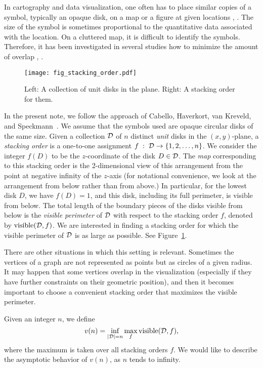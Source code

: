 \documentclass[11pt]{article}
\DeclareMathOperator{\vis}{\mathrm{visible}}
\begin{document}
In cartography and data visualization, one often has to place similar copies of a symbol, typically an opaque disk, on a map or a figure at given locations \cite{De99}, \cite{Gr90}. The size of the symbol is sometimes proportional to the quantitative data associated with the location. On a cluttered map, it is difficult to identify the symbols. Therefore, it has been investigated in several studies how to minimize the amount of overlap \cite{GrC78}, \cite{SlM03}.

\begin{figure}
\centerline{\texttt{[image: fig\_stacking\_order.pdf]}}
\caption{\label{fig_stacking_order}Left: A collection of unit disks in the plane. Right: A stacking order for them.}
\end{figure}


In the present note, we follow the approach of Cabello, Haverkort, van
Kreveld, and Speckmann~\cite{CaH10}. We assume that the symbols used are
opaque circular disks of the same size. Given a collection $\cal D$ of $n$
distinct {\em unit} disks in the $(x,y)$-plane, a {\em stacking order} is a one-to-one assignment $f\; :\;{\cal D} \rightarrow \{1, 2, \ldots, n\}$. We consider the integer $f(D)$ to be the $z$-coordinate of the disk $D\in\cal D$. The {\em map} corresponding to this stacking order is the 2-dimensional view of this arrangement from the point at negative infinity of the $z$-axis (for notational convenience, we look at the arrangement from below rather than from above.) In particular, for the lowest disk $D$, we have $f(D)=1$, and this disk, including its full perimeter, is visible from below. The total length of the
boundary pieces of the disks visible from below is the {\em visible perimeter}
of $\cal D$ with respect to the stacking order $f$, denoted by $\vis({\cal
  D},f)$. We are interested in finding a stacking order for which the visible
perimeter of $\cal D$ is as large as possible. See
Figure~\ref{fig_stacking_order}.

There are other situations in which this setting is relevant. Sometimes the vertices of a graph are not represented as points but as circles of a given radius. It may happen that
some vertices overlap in the visualization (especially if they have
further constraints on their geometric position), and then it becomes important to choose a
convenient stacking order that maximizes the visible perimeter.

Given an integer $n$, we define
\begin{equation}\label{eq_def_v}
v(n) = \inf_{|{\cal D}|=n} \max_{f} \vis({\cal D},f),
\end{equation}
where the maximum is taken over all stacking orders $f$.
We would like to describe the asymptotic behavior of $v(n)$, as $n$ tends to infinity.
\end{document}
